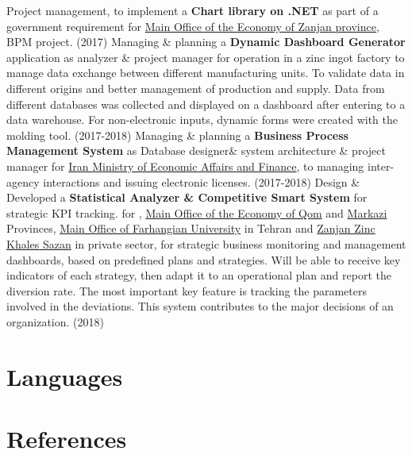 \documentclass[10pt,a4paper,sans]{moderncv} %
\begin{document}
        \cvitem{$\bullet$}
        {
            Project management, to implement a \textbf{Chart library on .NET} as part of a government requirement for \href{http://zn.mefa.ir/}{Main Office of the Economy of Zanjan province}, BPM project. (2017)
        }
        \cvitem{$\bullet$}
        {
            Managing \& planning a \textbf{Dynamic Dashboard Generator} application as analyzer \& project manager for operation in a zinc ingot factory to manage data exchange between different manufacturing units. To validate data in different origins and better management of production and supply. Data from different databases was collected and displayed on a dashboard after entering to a data warehouse. For non-electronic inputs, dynamic forms were created with the molding tool. (2017-2018)
        }
        \cvitem{$\bullet$}
        {
            Managing \& planning a \textbf{Business Process Management System} as Database designer\& system architecture \& project manager for  \href{http://sama.mefa.ir/Portal/Home/default.aspx}{Iran Ministry of Economic Affairs and Finance}, to managing inter-agency interactions and issuing electronic licenses. (2017-2018)
        }
    	\cvitem{$\bullet$}
    	{
    	    Design \& Developed a \textbf{Statistical Analyzer \& Competitive Smart System} for strategic KPI tracking. for , \href{http://qo.mefa.ir/}{Main Office of the Economy of Qom} and \href{http://mk.mefa.ir/}{Markazi} Provinces, \href{https://cfu.ac.ir/}{Main Office of Farhangian University} in Tehran and \href{http://zzkico.ir/en-us/Home/groups/15}{Zanjan Zinc Khales Sazan} in private sector, for strategic business monitoring and management dashboards, based on predefined plans and strategies. Will be able to receive key indicators of each strategy, then adapt it to an operational plan and report the diversion rate. The most important key feature is tracking the parameters involved in the deviations. This system contributes to the major decisions of an organization. (2018)
    	}
	
	\section{Languages}
        \begin{multicols}{2}
        \end{multicols}
        
	\section{References}
        \begin{multicols}{2}
        \end{multicols}
\end{document}

